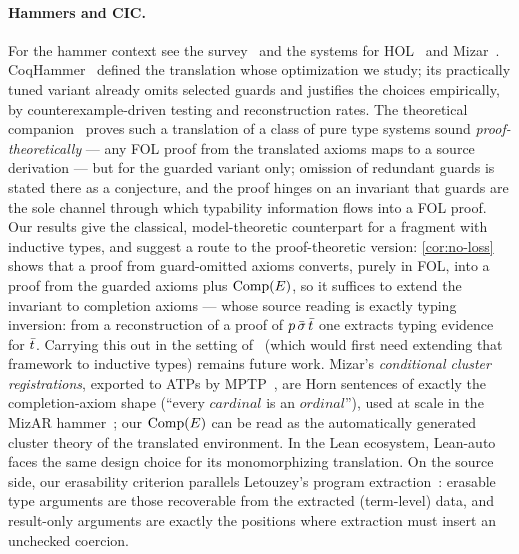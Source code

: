 \paragraph{Hammers and CIC.}
For the hammer context see the survey~\cite{BlanchetteKaliszykPaulsonUrban2016}
and the systems for HOL~\cite{PaulsonBlanchette2010,KaliszykUrban2014} and
Mizar~\cite{KaliszykUrban2015}.  CoqHammer~\cite{CzajkaKaliszyk2018}
defined the translation whose optimization we study; its practically
tuned variant already omits selected guards and justifies the choices
empirically, by counterexample-driven testing and reconstruction rates.
The theoretical companion~\cite{Czajka2018} proves such a translation of
a class of pure type systems sound \emph{proof-theoretically} --- any FOL
proof from the translated axioms maps to a source derivation --- but for
the guarded variant only; omission of redundant guards is stated there as
a conjecture, and the proof hinges on an invariant that guards are the
sole channel through which typability information flows into a FOL proof.
Our results give the classical, model-theoretic counterpart for a
fragment with inductive types, and suggest a route to the proof-theoretic
version: \cref{cor:no-loss} shows that a proof from guard-omitted axioms
converts, purely in FOL, into a proof from the guarded axioms plus
$\mathrm{Comp}(E)$, so it suffices to extend the invariant to completion axioms ---
whose source reading is exactly typing inversion: from a reconstruction
of a proof of $p\,\bar{\sigma}\,\bar{t}$ one extracts typing evidence for
$\bar{t}$.  Carrying this out in the setting of~\cite{Czajka2018}
(which would first need extending that framework to inductive types)
remains future work.  Mizar's \emph{conditional cluster registrations},
exported to ATPs by MPTP~\cite{Urban2006}, are Horn sentences of exactly
the completion-axiom shape (``every $\mathit{cardinal}$ is an
$\mathit{ordinal}$''), used at scale in the MizAR
hammer~\cite{KaliszykUrban2015}; our $\mathrm{Comp}(E)$ can be read as the
automatically generated cluster theory of the translated environment.
In the Lean ecosystem, Lean-auto~\cite{LeanAuto2025} faces the same
design choice for its monomorphizing translation.  On the source side,
our erasability criterion parallels Letouzey's program
extraction~\cite{Letouzey2003}: erasable type arguments are those
recoverable from the extracted (term-level) data, and result-only
arguments are exactly the positions where extraction must insert an
unchecked coercion.


